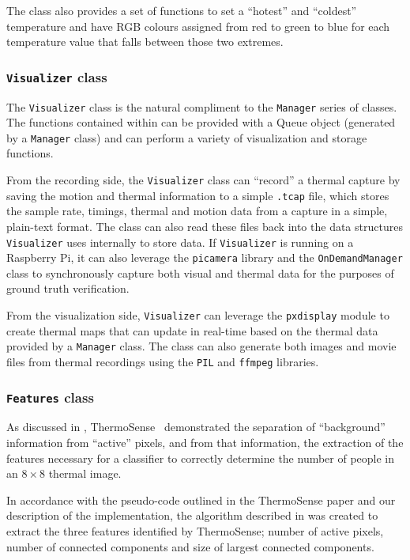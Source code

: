 \documentclass[../thesis/thesis.tex]{subfiles}
\begin{document}
The class also provides a set of functions to set a ``hotest'' and ``coldest'' temperature and have RGB colours assigned from red to green to blue for each temperature value that falls between those two extremes.

\subsubsection*{\texttt{Visualizer} class}
The \texttt{Visualizer} class is the natural compliment to the \texttt{Manager} series of classes. The functions contained within can be provided with a Queue object (generated by a \texttt{Manager} class) and can perform a variety of visualization and storage functions.

From the recording side, the \texttt{Visualizer} class can ``record'' a thermal capture by saving the motion and thermal information to a simple \texttt{.tcap} file, which stores the sample rate, timings, thermal and motion data from a capture in a simple, plain-text format. The class can also read these files back into the data structures \texttt{Visualizer} uses internally to store data. If \texttt{Visualizer} is running on a Raspberry Pi, it can also leverage the \texttt{picamera} library and the \texttt{OnDemandManager} class to synchronously capture both visual and thermal data for the purposes of ground truth verification.

From the visualization side, \texttt{Visualizer} can leverage the \texttt{pxdisplay} module to create thermal maps that can update in real-time based on the thermal data provided by a \texttt{Manager} class. The class can also generate both images and movie files from thermal recordings using the \texttt{PIL} and \texttt{ffmpeg} libraries.

\subsubsection*{\texttt{Features} class}
As discussed in , ThermoSense~\cite{beltran2013thermosense} demonstrated the separation of ``background'' information from ``active'' pixels, and from that information, the extraction of the features necessary for a classifier to correctly determine the number of people in an $8\times8$ thermal image.

In accordance with the pseudo-code outlined in the ThermoSense paper and our description of the implementation, the algorithm described in  was created to extract the three features identified by ThermoSense; number of active pixels, number of connected components and size of largest connected components.
\end{document}
